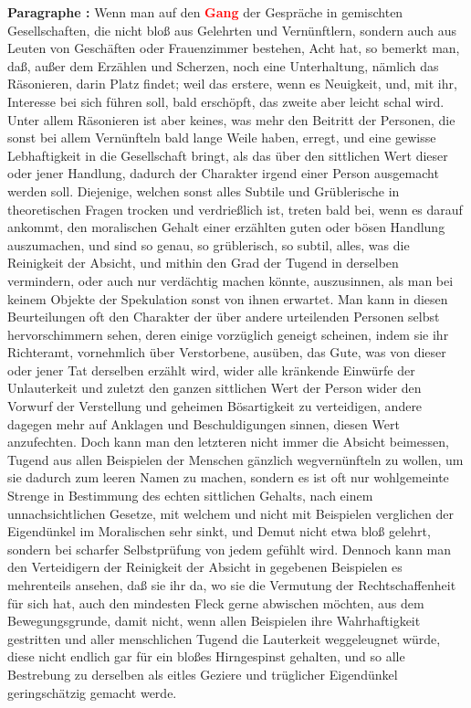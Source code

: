\documentclass[a4paper,12pt,twoside]{book}
\newcommand{\match}[1]{\textcolor{red}{\textbf{#1}}}
\begin{document}
	\noindent\textbf{Paragraphe : }Wenn man auf den \match{Gang} der Gespräche in gemischten Gesellschaften, die nicht bloß aus Gelehrten und Vernünftlern, sondern auch aus Leuten von Geschäften oder Frauenzimmer bestehen, Acht hat, so bemerkt man, daß, außer dem Erzählen und Scherzen, noch eine Unterhaltung, nämlich das Räsonieren, darin Platz findet; weil das erstere, wenn es Neuigkeit, und, mit ihr, Interesse bei sich führen soll, bald erschöpft, das zweite aber leicht schal wird. Unter allem Räsonieren ist aber keines, was mehr den Beitritt der Personen, die sonst bei allem Vernünfteln bald lange Weile haben, erregt, und eine gewisse Lebhaftigkeit in die Gesellschaft bringt, als das über den sittlichen Wert dieser oder jener Handlung, dadurch der Charakter irgend einer Person ausgemacht werden soll. Diejenige, welchen sonst alles Subtile und Grüblerische in theoretischen Fragen trocken und verdrießlich ist, treten bald bei, wenn es darauf ankommt, den moralischen Gehalt einer erzählten guten oder bösen Handlung auszumachen, und sind so genau, so grüblerisch, so subtil, alles, was die Reinigkeit der Absicht, und mithin  den Grad der Tugend in derselben vermindern, oder auch nur verdächtig machen könnte, auszusinnen, als man bei keinem Objekte der Spekulation sonst von ihnen erwartet. Man kann in diesen Beurteilungen oft den Charakter der über andere urteilenden Personen selbst hervorschimmern sehen, deren einige vorzüglich geneigt scheinen, indem sie ihr Richteramt, vornehmlich über Verstorbene, ausüben, das Gute, was von dieser oder jener Tat derselben erzählt wird, wider alle kränkende Einwürfe der Unlauterkeit und zuletzt den ganzen sittlichen Wert der Person wider den Vorwurf der Verstellung und geheimen Bösartigkeit zu verteidigen, andere dagegen mehr auf Anklagen und Beschuldigungen sinnen, diesen Wert anzufechten. Doch kann man den letzteren nicht immer die Absicht beimessen, Tugend aus allen Beispielen der Menschen gänzlich wegvernünfteln zu wollen, um sie dadurch zum leeren Namen zu machen, sondern es ist oft nur wohlgemeinte Strenge in Bestimmung des echten sittlichen Gehalts, nach einem unnachsichtlichen Gesetze, mit welchem und nicht mit Beispielen verglichen der Eigendünkel im Moralischen sehr sinkt, und Demut nicht etwa bloß gelehrt, sondern bei scharfer Selbstprüfung von jedem gefühlt wird. Dennoch kann man den Verteidigern der Reinigkeit der Absicht in gegebenen Beispielen es mehrenteils ansehen, daß sie ihr da, wo sie die Vermutung der Rechtschaffenheit für sich hat, auch den mindesten Fleck gerne abwischen möchten, aus dem Bewegungsgrunde, damit nicht, wenn allen Beispielen ihre Wahrhaftigkeit gestritten und aller menschlichen Tugend die Lauterkeit weggeleugnet würde, diese nicht endlich gar für ein bloßes Hirngespinst gehalten, und so alle Bestrebung zu derselben als eitles Geziere und trüglicher Eigendünkel geringschätzig gemacht werde. 
	
\end{document}
